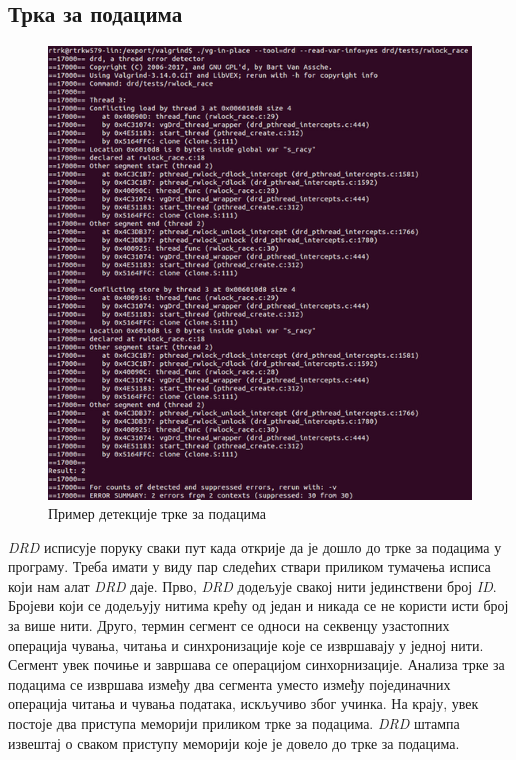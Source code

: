 \documentclass[12pt,oneside]{memoir}
\begin{document}
\subsection{Трка за подацима}

\begin{figure}[h!]
\begin{center}
\includegraphics[scale=0.75]{slika20.png}
\end{center}
\caption{ Пример детекције трке за подацима}
\label{fig:drd-data-race}
\end{figure}

\indent \textit{DRD} исписује поруку сваки пут када открије да је дошло до трке за подацима у програму. Треба имати у виду пар следећих ствари приликом тумачења исписа који нам алат \textit{DRD} даје. Прво, \textit{DRD} додељује свакој нити јединствени број \textit{ID}. Бројеви који се додељују нитима крећу од један и никада се не користи исти број за више нити. Друго, термин сегмент се односи на секвенцу узастопних операција чувања, читања и синхронизације које се извршавају у једној нити. Сегмент увек почиње и завршава се операцијом синхорнизације. Анализа трке за подацима се извршава између два сегмента уместо између појединачних операција читања и чувања података, искључиво због учинка. На крају, увек постоје два приступа меморији приликом трке за подацима. \textit{DRD} штампа извештај о сваком приступу меморији које је довело до трке за подацима.
\end{document}
